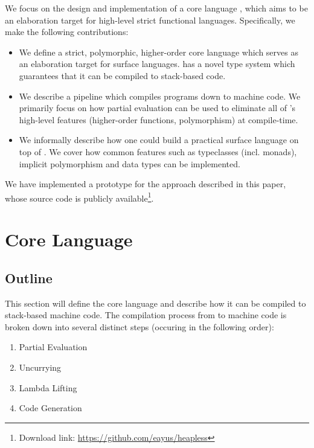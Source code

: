 \documentclass[runningheads]{llncs}
\begin{document}
We focus on the design and implementation of a core language \core{}, which aims to be an elaboration target for high-level strict functional languages. Specifically, we make the following contributions:

\begin{itemize}
  \item We define a strict, polymorphic, higher-order core language \core{} which serves as an elaboration target for surface languages. \core{} has a novel type system which guarantees that it can be compiled to stack-based code.

  \item We describe a pipeline which compiles \core{} programs down to machine code. We primarily focus on how partial evaluation can be used to eliminate all of \core{}'s high-level features (higher-order functions, polymorphism) at compile-time. 
  
  \item We informally describe how one could build a practical surface language on top of \core{}. We cover how common features such as typeclasses (incl. monads), implicit polymorphism and data types can be implemented.
\end{itemize}

We have implemented a prototype for the approach described in this paper, whose source code is publicly available\footnote{Download link: \url{https://github.com/eayus/heapless}}.

\section{Core Language}


\subsection{Outline}

This section will define the core language \core{} and describe how it can be compiled to stack-based machine code. The compilation process from \core{} to machine code is broken down into several distinct steps (occuring in the following order):

\begin{enumerate}
  \item Partial Evaluation
  \item Uncurrying
  \item Lambda Lifting
  \item Code Generation
\end{enumerate}
\end{document}
